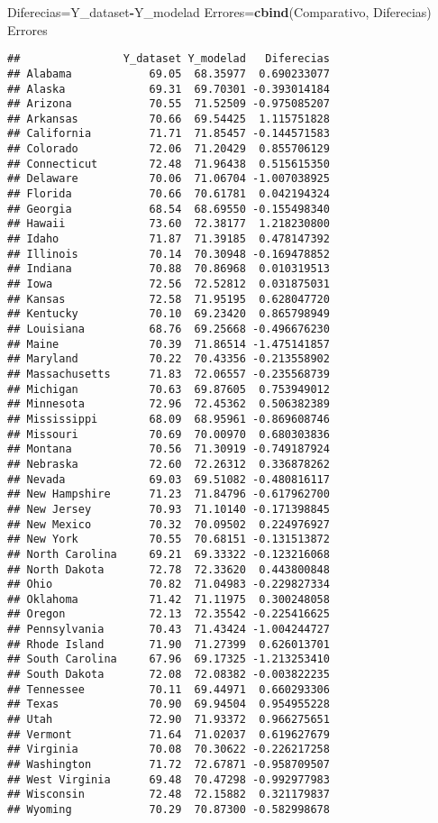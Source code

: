 \documentclass[]{article}
\newenvironment{Shaded}{\begin{snugshade}}{\end{snugshade}}
\newcommand{\KeywordTok}[1]{\textcolor[rgb]{0.13,0.29,0.53}{\textbf{#1}}}
\newcommand{\OperatorTok}[1]{\textcolor[rgb]{0.81,0.36,0.00}{\textbf{#1}}}
\newcommand{\NormalTok}[1]{#1}
\begin{document}
\begin{Shaded}
\begin{Highlighting}[]
\NormalTok{Diferecias=Y_dataset}\OperatorTok{-}\NormalTok{Y_modelad}
\NormalTok{Errores=}\KeywordTok{cbind}\NormalTok{(Comparativo, Diferecias)}
\NormalTok{Errores}
\end{Highlighting}
\end{Shaded}

\begin{verbatim}
##                Y_dataset Y_modelad   Diferecias
## Alabama            69.05  68.35977  0.690233077
## Alaska             69.31  69.70301 -0.393014184
## Arizona            70.55  71.52509 -0.975085207
## Arkansas           70.66  69.54425  1.115751828
## California         71.71  71.85457 -0.144571583
## Colorado           72.06  71.20429  0.855706129
## Connecticut        72.48  71.96438  0.515615350
## Delaware           70.06  71.06704 -1.007038925
## Florida            70.66  70.61781  0.042194324
## Georgia            68.54  68.69550 -0.155498340
## Hawaii             73.60  72.38177  1.218230800
## Idaho              71.87  71.39185  0.478147392
## Illinois           70.14  70.30948 -0.169478852
## Indiana            70.88  70.86968  0.010319513
## Iowa               72.56  72.52812  0.031875031
## Kansas             72.58  71.95195  0.628047720
## Kentucky           70.10  69.23420  0.865798949
## Louisiana          68.76  69.25668 -0.496676230
## Maine              70.39  71.86514 -1.475141857
## Maryland           70.22  70.43356 -0.213558902
## Massachusetts      71.83  72.06557 -0.235568739
## Michigan           70.63  69.87605  0.753949012
## Minnesota          72.96  72.45362  0.506382389
## Mississippi        68.09  68.95961 -0.869608746
## Missouri           70.69  70.00970  0.680303836
## Montana            70.56  71.30919 -0.749187924
## Nebraska           72.60  72.26312  0.336878262
## Nevada             69.03  69.51082 -0.480816117
## New Hampshire      71.23  71.84796 -0.617962700
## New Jersey         70.93  71.10140 -0.171398845
## New Mexico         70.32  70.09502  0.224976927
## New York           70.55  70.68151 -0.131513872
## North Carolina     69.21  69.33322 -0.123216068
## North Dakota       72.78  72.33620  0.443800848
## Ohio               70.82  71.04983 -0.229827334
## Oklahoma           71.42  71.11975  0.300248058
## Oregon             72.13  72.35542 -0.225416625
## Pennsylvania       70.43  71.43424 -1.004244727
## Rhode Island       71.90  71.27399  0.626013701
## South Carolina     67.96  69.17325 -1.213253410
## South Dakota       72.08  72.08382 -0.003822235
## Tennessee          70.11  69.44971  0.660293306
## Texas              70.90  69.94504  0.954955228
## Utah               72.90  71.93372  0.966275651
## Vermont            71.64  71.02037  0.619627679
## Virginia           70.08  70.30622 -0.226217258
## Washington         71.72  72.67871 -0.958709507
## West Virginia      69.48  70.47298 -0.992977983
## Wisconsin          72.48  72.15882  0.321179837
## Wyoming            70.29  70.87300 -0.582998678
\end{verbatim}
\end{document}
